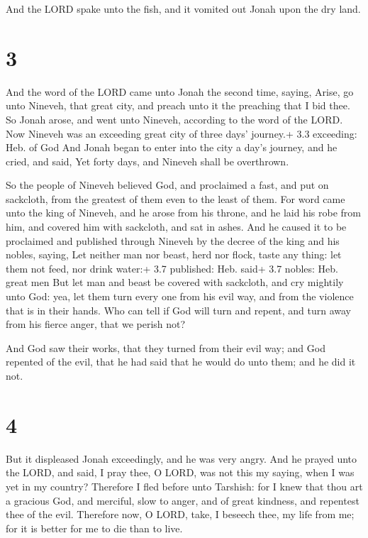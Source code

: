  And the LORD spake unto the fish, and it vomited out
Jonah upon the dry land.

\hypertarget{section-2}{%
\section{3}\label{section-2}}

 And the word of the LORD came unto Jonah the second time,
saying,  Arise, go unto Nineveh, that great city, and preach
unto it the preaching that I bid thee.  So Jonah arose, and
went unto Nineveh, according to the word of the LORD. Now Nineveh was an
exceeding great city of three days' journey.+ 3.3 exceeding: Heb. of God
 And Jonah began to enter into the city a day's journey, and
he cried, and said, Yet forty days, and Nineveh shall be overthrown.

 So the people of Nineveh believed God, and proclaimed a
fast, and put on sackcloth, from the greatest of them even to the least
of them.  For word came unto the king of Nineveh, and he
arose from his throne, and he laid his robe from him, and covered him
with sackcloth, and sat in ashes.  And he caused it to be
proclaimed and published through Nineveh by the decree of the king and
his nobles, saying, Let neither man nor beast, herd nor flock, taste any
thing: let them not feed, nor drink water:+ 3.7 published: Heb. said+
3.7 nobles: Heb. great men  But let man and beast be covered
with sackcloth, and cry mightily unto God: yea, let them turn every one
from his evil way, and from the violence that is in their hands.
 Who can tell if God will turn and repent, and turn away
from his fierce anger, that we perish not?

 And God saw their works, that they turned from their
evil way; and God repented of the evil, that he had said that he would
do unto them; and he did it not.

\hypertarget{section-3}{%
\section{4}\label{section-3}}

 But it displeased Jonah exceedingly, and he was very angry.
 And he prayed unto the LORD, and said, I pray thee, O LORD,
was not this my saying, when I was yet in my country? Therefore I fled
before unto Tarshish: for I knew that thou art a gracious God, and
merciful, slow to anger, and of great kindness, and repentest thee of
the evil.  Therefore now, O LORD, take, I beseech thee, my
life from me; for it is better for me to die than to live.

